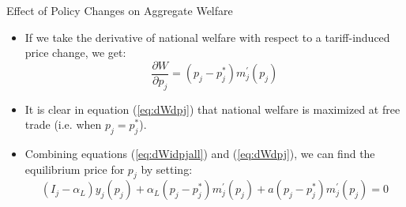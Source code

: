 \documentclass[aspectratio=169]{beamer}
\begin{document}

\begin{frame}{Effect of Policy Changes on Aggregate Welfare}

\begin{itemize}
    \item<1-> If we take the derivative of national welfare with respect to a tariff-induced price change, we get:
    \begin{equation}
        \frac{\partial W}{\partial p_{j}} = \left( p_{j} - p_{j}^{*} \right) m_{j}^{'}\left( p_{j} \right)
        \label{eq:dWdpj}
    \end{equation}
    \item<2-> It is clear in equation (\ref{eq:dWdpj}) that national welfare is maximized at free trade (i.e. when $ p_{j} = p_{j}^{*} $).
    \item<3-> Combining equations (\ref{eq:dWidpjall}) and (\ref{eq:dWdpj}), we can find the equilibrium price for $ p_{j} $ by setting:
    \begin{equation}
        \left( I_{j} - \alpha_{L} \right) y_{j}\left( p_{j} \right) + \alpha_{L}\left( p_{j} - p_{j}^{*} \right) m_{j}^{'}\left( p_{j} \right) + a\left( p_{j} - p_{j}^{*} \right) m_{j}^{'}\left( p_{j} \right) = 0
        \label{eq:derivative}
    \end{equation}
\end{itemize}
    
\end{frame}

\end{document}
